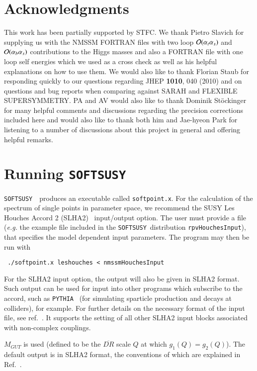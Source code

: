 \documentclass[final,3p,times,pdflatex]{elsarticle}
\def\SOFTSUSY{{\tt SOFTSUSY}\ }
\def\code#1{\small{\tt #1}\normalsize}
\def\at{\alpha_t}
\def\ab{\alpha_b}
\def\as{\alpha_s}
\def\oatas{{\cal O}(\at\as)}
\def\oabas{{\cal O}(\ab\as)}
\begin{document}
\section*{Acknowledgments}
This work has been partially supported by STFC\@. We thank Pietro
Slavich for supplying us with the NMSSM FORTRAN files with two loop
$\oatas$ and $\oabas$ contributions to the Higgs masses and also a
FORTRAN file with one loop self energies which we used as a cross
check as well as his helpful explanations on how to use them. We would
also like to thank Florian Staub for responding quickly to our questions
regarding JHEP {\bf 1010}, 040 (2010) and on questions and bug reports
when comparing against SARAH and FLEXIBLE SUPERSYMMETRY. PA and AV
would also like to thank Dominik St\"ockinger for many helpful
comments and discussions regarding the precision corrections included
here and would also like to thank both him and Jae-hyeon Park for
listening to a number of discussions about this project in general and
offering helpful remarks.


\appendix

\section{Running \SOFTSUSY}
\label{sec:run}

\SOFTSUSY~produces an executable called \code{softpoint.x}. For the calculation
of the spectrum of single points in parameter space, we recommend the
SUSY Les Houches Accord 2 (SLHA2)~\cite{Allanach:2008qq}  input/output
option. The user must provide a file (\textit{e.g.} the example file included
in the \SOFTSUSY distribution
\code{rpvHouchesInput}), that specifies the model dependent input
parameters. The program may then be run with
\small
\begin{verbatim}
 ./softpoint.x leshouches < nmssmHouchesInput
\end{verbatim}
\normalsize
For the SLHA2 input option, 
the output will also be given in 
SLHA2 format. Such output can be used for
input into other programs which subscribe to the accord, such as
\code{PYTHIA}~\cite{Sjostrand:2007gs} (for
simulating sparticle production and decays at colliders), for example. For
further details on the necessary format of 
the input file, see ref.~\cite{Allanach:2008qq}. It supports 
the setting of all other SLHA2 input blocks associated with non-complex
couplings. 

$M_{GUT}$ is used (defined to be the $\overline{DR}$ scale $Q$ at which $g_1(Q) =
g_2(Q)$). The default output is in SLHA2 format, the conventions of which are
explained in Ref.~\cite{Allanach:2008qq}. 
\end{document}
